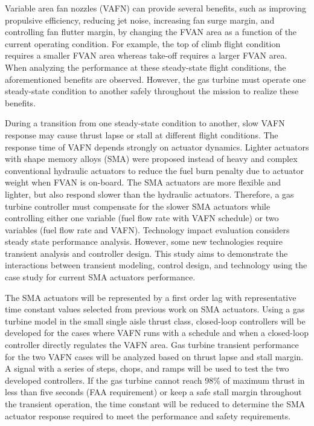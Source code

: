 
Variable area fan nozzles (VAFN) can provide several benefits, such as improving
propulsive efficiency, reducing jet noise, increasing fan surge margin, and 
controlling fan flutter margin, by changing the FVAN area as a function of the 
current operating condition.  For example, the top of climb flight condition 
requires a smaller FVAN area whereas take-off requires a larger FVAN area. 
When analyzing the performance at these steady-state flight conditions, 
the aforementioned benefits are observed.  However, the gas turbine must 
operate one steady-state condition to another safely throughout the mission to 
realize these benefits. 

During a transition from one steady-state condition to another, slow VAFN 
response may cause thrust lapse or stall at different flight conditions. The 
response time of VAFN depends strongly on actuator dynamics. Lighter actuators
with shape memory alloys (SMA) were proposed instead of heavy and complex 
conventional hydraulic actuators to reduce the fuel burn penalty due to actuator
weight when FVAN is on-board. The SMA actuators are more flexible and lighter, 
but also respond slower than the hydraulic actuators. Therefore, a gas turbine 
controller must compensate for the slower SMA actuators while controlling either 
one variable (fuel flow rate with VAFN schedule) or two variables (fuel flow rate 
and VAFN). Technology impact evaluation considers steady state performance 
analysis. However, some new technologies require transient analysis and 
controller design. This study aims to demonstrate the interactions between 
transient modeling, control design, and technology using the case study for 
current SMA actuators performance.

The SMA actuators will be represented by a first order lag with representative 
time constant values selected from previous work on SMA actuators. Using a gas
turbine model in the small single aisle thrust class, closed-loop controllers will be
developed for the cases where VAFN runs with a schedule and when a 
closed-loop controller directly regulates the VAFN area. Gas turbine transient 
performance for the two VAFN cases will be analyzed based on thrust lapse and 
stall margin. A signal with a series of steps, chops, and ramps will be used to 
test the two developed controllers. If the gas turbine cannot reach 98\% of 
maximum thrust in less than five seconds (FAA requirement) or keep a safe stall 
margin throughout the transient operation, the time constant will be reduced to 
determine the SMA actuator response required to meet the performance and 
safety requirements.